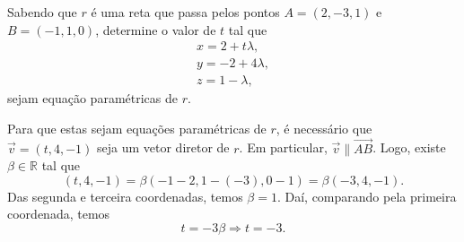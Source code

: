 \begin{exeresol}
  Sabendo que $r$ é uma reta que passa pelos pontos $A = (2,-3,1)$ e $B = (-1,1,0)$, determine o valor de $t$ tal que
  \begin{align}
    x = 2 + t\lambda,\\
    y = -2 + 4\lambda,\\
    z = 1 -\lambda,
  \end{align}
  sejam equação paramétricas de $r$.
\end{exeresol}
\begin{resol}
  Para que estas sejam equações paramétricas de $r$, é necessário que $\vec{v} = (t,4,-1)$ seja um vetor diretor de $r$. Em particular, $\vec{v} \parallel \overrightarrow{AB}$. Logo, existe $\beta\in\mathbb{R}$ tal que
  \begin{equation}
    (t,4,-1) = \beta (-1-2,1-(-3),0-1) = \beta (-3,4,-1).
  \end{equation}
  Das segunda e terceira coordenadas, temos $\beta = 1$. Daí, comparando pela primeira coordenada, temos
  \begin{equation}
    t = -3\beta \Rightarrow t = -3.
  \end{equation}
\end{resol}

